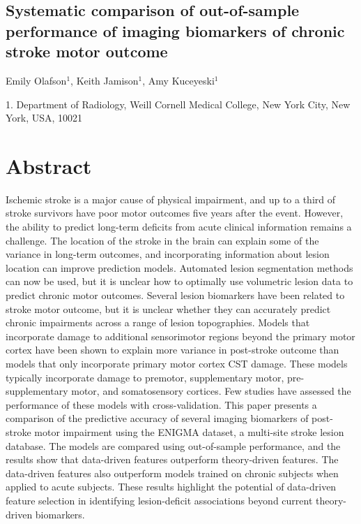 \documentclass[10pt]{article}
\begin{document}
 

\begin{center}
{\large \section*{Systematic comparison of out-of-sample performance of imaging biomarkers of chronic stroke motor outcome }}
\end{center}

\begin{center}
Emily Olafson$^1$, Keith Jamison$^1$, Amy Kuceyeski$^1$
\end{center}

    1. \textmd{Department of Radiology, Weill Cornell Medical College, New York City, New York, USA, 10021} 


\section{Abstract}
Ischemic stroke is a major cause of physical impairment, and up to a third of stroke survivors have poor motor outcomes five years after the event. However, the ability to predict long-term deficits from acute clinical information remains a challenge. The location of the stroke in the brain can explain some of the variance in long-term outcomes, and incorporating information about lesion location can improve prediction models. Automated lesion segmentation methods can now be used, but it is unclear how to optimally use volumetric lesion data to predict chronic motor outcomes. Several lesion biomarkers have been related to stroke motor outcome, but it is unclear whether they can accurately predict chronic impairments across a range of lesion topographies. Models that incorporate damage to additional sensorimotor regions beyond the primary motor cortex have been shown to explain more variance in post-stroke outcome than models that only incorporate primary motor cortex CST damage. These models typically incorporate damage to premotor, supplementary motor, pre-supplementary motor, and somatosensory cortices. Few studies have assessed the performance of these models with cross-validation. This paper presents a comparison of the predictive accuracy of several imaging biomarkers of post-stroke motor impairment using the ENIGMA dataset, a multi-site stroke lesion database. The models are compared using out-of-sample performance, and the results show that data-driven features outperform theory-driven features. The data-driven features also outperform models trained on chronic subjects when applied to acute subjects. These results highlight the potential of data-driven feature selection in identifying lesion-deficit associations beyond current theory-driven biomarkers.
\end{document}
